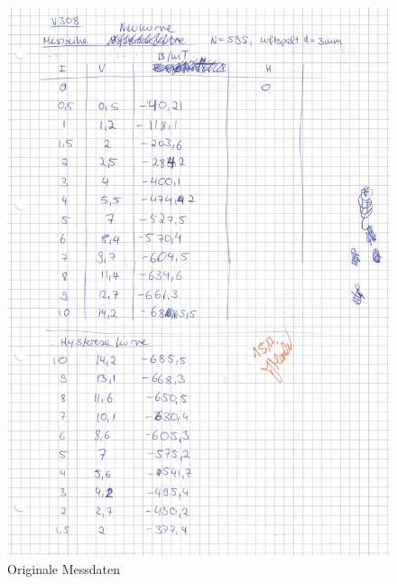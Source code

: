 \begin{figure}[h!]
  \centering
  \includegraphics[width=\textwidth]{OMD1.pdf}
  \caption{Originale Messdaten}
  \label{fig:OMD1}
\end{figure}

